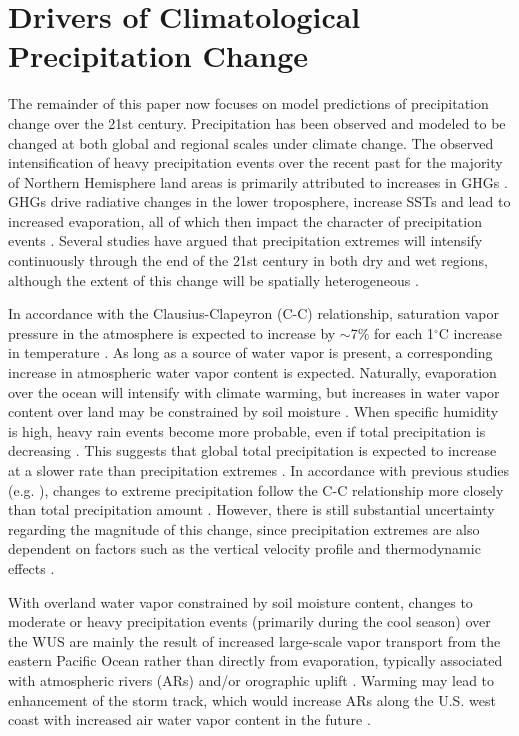 \documentclass{ametsoc}
\begin{document}
\section{Drivers of Climatological Precipitation Change} \label{sec:ChangeDrivers}

The remainder of this paper now focuses on model predictions of precipitation change over the 21st century.  Precipitation has been observed and modeled to be changed at both global and regional scales under climate change. The observed intensification of heavy precipitation events over the recent past for the majority of Northern Hemisphere land areas is primarily attributed to increases in GHGs \citep{min2011human}.  GHGs drive radiative changes in the lower troposphere, increase SSTs and lead to increased evaporation, all of which then impact the character of precipitation events \citep{allen2002constraints, sugi2004mechanism}. Several studies have argued that precipitation extremes will intensify continuously through the end of the 21st century in both dry and wet regions, although the extent of this change will be spatially heterogeneous \citep{donat2016more}.


In accordance with the Clausius-Clapeyron (C-C) relationship, saturation vapor pressure in the atmosphere is expected to increase by $\sim$7$\%$ for each 1$^\circ$C increase in temperature \citep{allan2008atmospheric}.  As long as a source of water vapor is present, a corresponding increase in atmospheric water vapor content is expected.  Naturally, evaporation over the ocean will intensify with climate warming, but increases in water vapor content over land may be constrained by soil moisture \citep{cayan2010future}. When specific humidity is high, heavy rain events become more probable, even if total precipitation is decreasing \citep{allen2002constraints, trenberth2011changes}. This suggests that global total precipitation is expected to increase at a slower rate than precipitation extremes \citep{allan2008atmospheric}. In accordance with previous studies (e.g. \cite{allan2008atmospheric, o2009physical, min2011human}), changes to extreme precipitation follow the C-C relationship more closely than total precipitation amount \citep{trenberth2003changing}. However, there is still substantial uncertainty regarding the magnitude of this change, since precipitation extremes are also dependent on factors such as the vertical velocity profile and thermodynamic effects \citep{o2009physical}.


With overland water vapor constrained by soil moisture content, changes to moderate or heavy precipitation events (primarily during the cool season) over the WUS are mainly the result of increased large-scale vapor transport from the eastern Pacific Ocean rather than directly from evaporation, typically associated with atmospheric rivers (ARs) and/or orographic uplift \citep{trenberth2003changing, neiman2008meteorological}. Warming may lead to enhancement of the storm track, which would increase ARs along the U.S. west coast with increased air water vapor content in the future \citep{dettinger2011climate, gao2015dynamical}.
\end{document}

